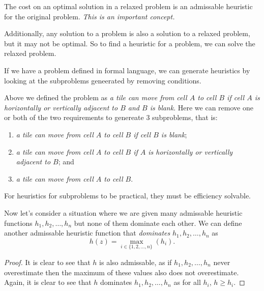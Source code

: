 The cost on an optimal solution in a relaxed problem is an admissable heuristic for the original problem. \emph{This is an important concept.}

Additionally, any solution to a problem is also a solution to a relaxed problem, but it may not be optimal. So to find a heuristic for a problem, we can solve the relaxed problem.

If we have a problem defined in formal language, we can generate heuristics by looking at the subproblems geneerated by removing conditions.

\begin{example}
    Above we defined the problem as \emph{a tile can move from cell $A$ to cell $B$ if cell $A$ is horizontally or vertically adjacent to $B$ and $B$ is blank}. Here we can remove one or both of the two requirements to genereate 3 subproblems, that is:
    \begin{enumerate}
        \item \emph{a tile can move from cell $A$ to cell $B$ if cell $B$ is blank};
        \item \emph{a tile can move from cell $A$ to cell $B$ if $A$ is horizontally or vertically adjacent to $B$}; and
        \item \emph{a tile can move from cell $A$ to cell $B$}.
    \end{enumerate}
\end{example}

For heuristics for subproblems to be practical, they must be efficiency solvable.

\begin{proposition}
    Now let's consider a situation where we are given many admissable heuristic functions $h_1, h_2, \ldots, h_n$ but none of them dominate each other. We can define another admissable heuristic function that \emph{dominates} $h_1, h_2, \ldots, h_n$ as
    \[ h(z) = \max_{i \in \{1, 2, \ldots, n\}}{(h_i)}. \]
\end{proposition}

\begin{proof}
    It is clear to see that $h$ is also admissable, as if $h_1, h_2, \ldots, h_n$ never overestimate then the maximum of these values also does not overestimate. Again, it is clear to see that $h$ dominates $h_1, h_2, \ldots, h_n$ as for all $h_i$, $h \geq h_i$.
\end{proof}
